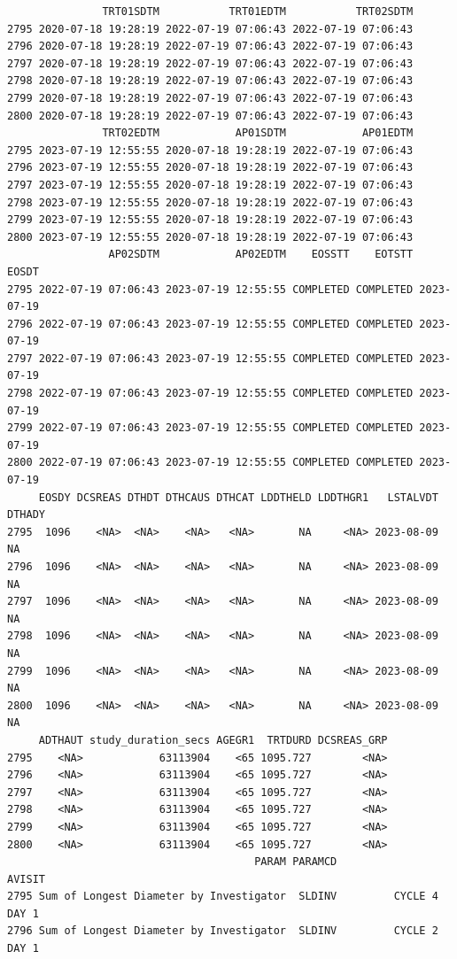 \documentclass[
  letterpaper,
  DIV=11,
  numbers=noendperiod]{scrreprt}
\begin{document}
\begin{tcolorbox}[enhanced jigsaw, leftrule=.75mm, arc=.35mm, colback=white, colframe=quarto-callout-note-color-frame, opacityback=0, toprule=.15mm, bottomrule=.15mm, rightrule=.15mm, left=2mm, breakable]
\begin{minipage}[t]{\textwidth - 5.5mm}
\begin{verbatim}
               TRT01SDTM           TRT01EDTM           TRT02SDTM
2795 2020-07-18 19:28:19 2022-07-19 07:06:43 2022-07-19 07:06:43
2796 2020-07-18 19:28:19 2022-07-19 07:06:43 2022-07-19 07:06:43
2797 2020-07-18 19:28:19 2022-07-19 07:06:43 2022-07-19 07:06:43
2798 2020-07-18 19:28:19 2022-07-19 07:06:43 2022-07-19 07:06:43
2799 2020-07-18 19:28:19 2022-07-19 07:06:43 2022-07-19 07:06:43
2800 2020-07-18 19:28:19 2022-07-19 07:06:43 2022-07-19 07:06:43
               TRT02EDTM            AP01SDTM            AP01EDTM
2795 2023-07-19 12:55:55 2020-07-18 19:28:19 2022-07-19 07:06:43
2796 2023-07-19 12:55:55 2020-07-18 19:28:19 2022-07-19 07:06:43
2797 2023-07-19 12:55:55 2020-07-18 19:28:19 2022-07-19 07:06:43
2798 2023-07-19 12:55:55 2020-07-18 19:28:19 2022-07-19 07:06:43
2799 2023-07-19 12:55:55 2020-07-18 19:28:19 2022-07-19 07:06:43
2800 2023-07-19 12:55:55 2020-07-18 19:28:19 2022-07-19 07:06:43
                AP02SDTM            AP02EDTM    EOSSTT    EOTSTT      EOSDT
2795 2022-07-19 07:06:43 2023-07-19 12:55:55 COMPLETED COMPLETED 2023-07-19
2796 2022-07-19 07:06:43 2023-07-19 12:55:55 COMPLETED COMPLETED 2023-07-19
2797 2022-07-19 07:06:43 2023-07-19 12:55:55 COMPLETED COMPLETED 2023-07-19
2798 2022-07-19 07:06:43 2023-07-19 12:55:55 COMPLETED COMPLETED 2023-07-19
2799 2022-07-19 07:06:43 2023-07-19 12:55:55 COMPLETED COMPLETED 2023-07-19
2800 2022-07-19 07:06:43 2023-07-19 12:55:55 COMPLETED COMPLETED 2023-07-19
     EOSDY DCSREAS DTHDT DTHCAUS DTHCAT LDDTHELD LDDTHGR1   LSTALVDT DTHADY
2795  1096    <NA>  <NA>    <NA>   <NA>       NA     <NA> 2023-08-09     NA
2796  1096    <NA>  <NA>    <NA>   <NA>       NA     <NA> 2023-08-09     NA
2797  1096    <NA>  <NA>    <NA>   <NA>       NA     <NA> 2023-08-09     NA
2798  1096    <NA>  <NA>    <NA>   <NA>       NA     <NA> 2023-08-09     NA
2799  1096    <NA>  <NA>    <NA>   <NA>       NA     <NA> 2023-08-09     NA
2800  1096    <NA>  <NA>    <NA>   <NA>       NA     <NA> 2023-08-09     NA
     ADTHAUT study_duration_secs AGEGR1  TRTDURD DCSREAS_GRP
2795    <NA>            63113904    <65 1095.727        <NA>
2796    <NA>            63113904    <65 1095.727        <NA>
2797    <NA>            63113904    <65 1095.727        <NA>
2798    <NA>            63113904    <65 1095.727        <NA>
2799    <NA>            63113904    <65 1095.727        <NA>
2800    <NA>            63113904    <65 1095.727        <NA>
                                       PARAM PARAMCD                AVISIT
2795 Sum of Longest Diameter by Investigator  SLDINV         CYCLE 4 DAY 1
2796 Sum of Longest Diameter by Investigator  SLDINV         CYCLE 2 DAY 1

\end{verbatim}
\end{minipage}
\end{tcolorbox}
\end{document}
